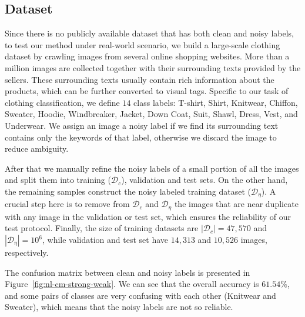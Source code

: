 \subsection{Dataset} %
\label{sub:nl-dataset}
Since there is no publicly available dataset that has both clean and noisy labels, to test our method under real-world scenario, we build a large-scale clothing dataset by crawling images from several online shopping websites. More than a million images are collected together with their surrounding texts provided by the sellers. These surrounding texts usually contain rich information about the products, which can be further converted to visual tags. Specific to our task of clothing classification, we define $14$ class labels: T-shirt, Shirt, Knitwear, Chiffon, Sweater, Hoodie, Windbreaker, Jacket, Down Coat, Suit, Shawl, Dress, Vest, and Underwear. We assign an image a noisy label if we find its surrounding text contains only the keywords of that label, otherwise we discard the image to reduce ambiguity.

After that we manually refine the noisy labels of a small portion of all the images and split them into training ($\mathcal{D}_c$), validation and test sets. On the other hand, the remaining samples construct the noisy labeled training dataset ($\mathcal{D}_{\eta}$). A crucial step here is to remove from $\mathcal{D}_c$ and $\mathcal{D}_{\eta}$ the images that are near duplicate with any image in the validation or test set, which ensures the reliability of our test protocol. Finally, the size of training datasets are $|\mathcal{D}_c| = 47,570$ and $|\mathcal{D}_{\eta}| = 10^6$, while validation and test set have $14,313$ and $10,526$ images, respectively.

The confusion matrix between clean and noisy labels is presented in Figure~\ref{fig:nl-cm-strong-weak}. We can see that the overall accuracy is $61.54\%$, and some pairs of classes are very confusing with each other (\eg Knitwear and Sweater), which means that the noisy labels are not so reliable.

